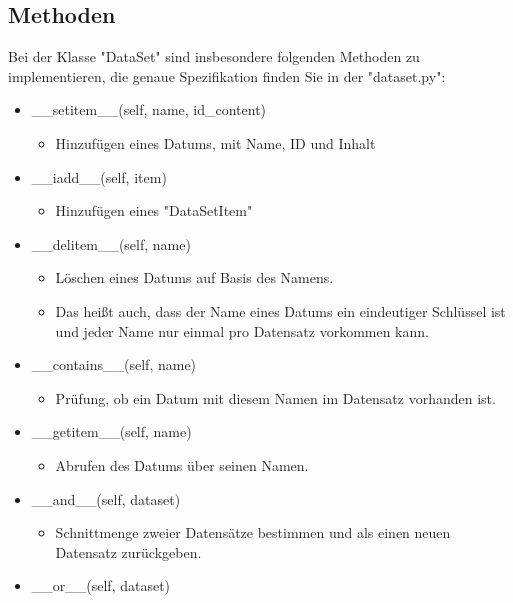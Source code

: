 \documentclass[a4paper,11pt]{article}
\begin{document}
\subsection{Methoden}
Bei der Klasse "DataSet" sind insbesondere folgenden Methoden zu implementieren, die genaue Spezifikation finden Sie in der "dataset.py": \\
\begin{itemize}[noitemsep,topsep=0pt]
    \item \_\_setitem\_\_(self, name, id\_content)
    \begin{itemize}[noitemsep,topsep=0pt]
        \item[] Hinzufügen eines Datums, mit Name, ID und Inhalt 
    \end{itemize}
    \item \_\_iadd\_\_(self, item)
    \begin{itemize}[noitemsep,topsep=0pt]
        \item[] Hinzufügen eines "DataSetItem"
    \end{itemize}
    \item \_\_delitem\_\_(self, name)
    \begin{itemize}[noitemsep,topsep=0pt]
        \item[] Löschen eines Datums auf Basis des Namens.
        \item[] Das heißt auch, dass der Name eines Datums ein eindeutiger Schlüssel ist und jeder Name nur einmal pro Datensatz vorkommen kann.
    \end{itemize}
    \item \_\_contains\_\_(self, name)
    \begin{itemize}[noitemsep,topsep=0pt]
        \item[] Prüfung, ob ein Datum mit diesem Namen im Datensatz vorhanden ist.
    \end{itemize}
    \item \_\_getitem\_\_(self, name)
    \begin{itemize}[noitemsep,topsep=0pt]
        \item[] Abrufen des Datums über seinen Namen.
    \end{itemize}
    \item \_\_and\_\_(self, dataset)
    \begin{itemize}[noitemsep,topsep=0pt]
        \item[] Schnittmenge zweier Datensätze bestimmen und als einen neuen Datensatz zurückgeben.
    \end{itemize}
    \item \_\_or\_\_(self, dataset)

\end{itemize}
\end{document}
